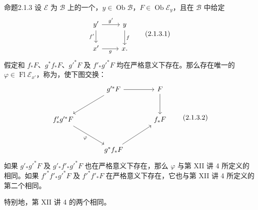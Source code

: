 \begin{SGAresult}{命题}{2.1.3}
设 $\mathcal E$ 为 $\mathcal B$ 上的一个，$y\in\operatorname{Ob}\mathcal B$，$F\in\operatorname{Ob}\mathcal E_y$，且在 $\mathcal B$ 中给定
\[
\begin{tikzcd}
y'\arrow[r,"g'"]\arrow[d,"f'"']&y\arrow[d,"f"]\\
x'\arrow[r,"g"']&x.
\end{tikzcd}\tag{2.1.3.1}
\]
假定和 $f_*F$、$g^*f_*F$、$g'^*F$ 及 $f'_*g'^*F$ 均在严格意义下存在。那么存在唯一的 $\varphi\in\operatorname{Fl}\mathcal E_{x'}$，称为，使下图交换：
\[
\begin{tikzcd}[row sep=large,column sep=large]
&g'^*F\arrow[r]\arrow[dl]&F\arrow[d]\\
f'_*g'^*F\arrow[dr,"\varphi"']&&f_*F\\
&g^*f_*F\arrow[ur]&
\end{tikzcd}\tag{2.1.3.2}
\]
如果 $g'_*g'^*F$ 及 $g'_*f'_*g'^*F$ 也在严格意义下存在，那么 $\varphi$ 与第 XII 讲 4 所定义的相同。如果 $f'^*f'_*g'^*F$ 及 $f'^*f'_*F$ 在严格意义下存在，它也与第 XII 讲 4 所定义的第二个相同。

特别地，第 XII 讲 4 的两个相同。
\end{SGAresult}
